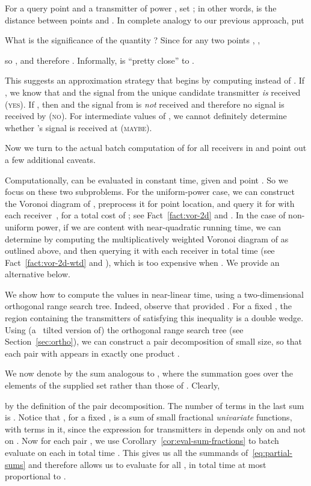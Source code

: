 \documentclass[11pt]{article}
\theoremstyle{remark}
\begin{document}
For a query point  and a transmitter  of power , set ; in other words,  is the 
distance between points  and .  In complete analogy to our
previous approach,
put




What is the significance of the quantity ?  Since for any two
points , , 

so , and therefore
.
Informally,  is ``pretty close'' to .  

This suggests an approximation strategy that begins by computing
 instead of .  If , we know that
 and the signal from the unique
candidate transmitter  \emph{is} received (\textsc{yes}).  If , then  and the signal from  is \emph{not} received
and therefore no signal is received by  (\textsc{no}).  For
intermediate values of , we cannot definitely determine whether
's signal is received at  (\textsc{maybe}). 

Now we turn to the actual batch computation of  for all
receivers in  and point out a few additional caveats.

Computationally,  can be evaluated in constant time, given
 and point .
So we focus on these two subproblems.
For the uniform-power case, we can construct the Voronoi diagram of ,
preprocess it for point location, and query it for  with each receiver~,
for a total cost of ; see Fact~\ref{fact:vor-2d}
and \cite{bcko-cgaa-08}.
In the case of non-uniform power, if we are content with near-quadratic
running time, we can determine  by computing the
multiplicatively weighted Voronoi diagram of  as outlined above, and
then querying it with each receiver in total time
 (see Fact~\ref{fact:vor-2d-wtd} and  \cite{bcko-cgaa-08,ae-oacwvdp-84}), which is too expensive when .  We provide an alternative below.

We show how to compute the values  in
near-linear time, using a two-dimensional orthogonal range search
tree.  Indeed, observe that  provided .  For a fixed , the region  containing the transmitters
of  satisfying this inequality is a  double wedge.
Using (a ~tilted version of) the orthogonal range search tree \cite{bcko-cgaa-08}
(see Section~\ref{sec:ortho}), we can construct a pair decomposition
 of small size, so that each pair  with  appears in exactly one product .  

We now denote by  the sum analogous to , where
the summation goes over the elements of the supplied set  rather than those
of .  Clearly,

by the definition of the pair decomposition.  The number of terms in the
last sum is .  Notice that , for a fixed ,
is a sum of small fractional \emph{univariate} functions, with 
terms in it, since the expression for transmitters in  depends only on
 and not on .  Now for each pair , we use
Corollary~\ref{cor:eval-sum-fractions} to batch evaluate  on each
 in total time .  This gives us all
the summands of~\eqref{eq:partial-sums} and therefore allows us to
evaluate  for all , in total time at most
proportional to . 
\end{document}
